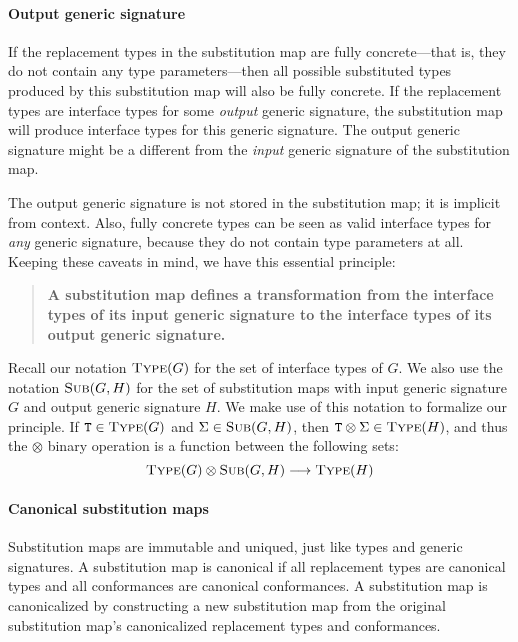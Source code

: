 \documentclass[../generics]{subfiles}
\begin{document}
\paragraph{Output generic signature}
%
If the replacement types in the substitution map are fully concrete---that is, they do not contain any type parameters---then all possible substituted types produced by this substitution map will also be fully concrete. If the replacement types are interface types for some \emph{output} generic signature, the substitution map will produce interface types for this generic signature. The output generic signature might be a different from the \emph{input} generic signature of the substitution map. 

The output generic signature is not stored in the substitution map; it is implicit from context. Also, fully concrete types can be seen as valid interface types for \emph{any} generic signature, because they do not contain type parameters at all. Keeping these caveats in mind, we have this essential principle:
\begin{quote}
\textbf{A substitution map defines a transformation from the interface types of its input generic signature to the interface types of its output generic signature.}
\end{quote}
Recall our notation $\textsc{Type}({G})$ for the set of interface types of $G$. We also use the notation $\textsc{Sub}({G, H})$ for the set of substitution maps with input generic signature $G$ and output generic signature $H$. We make use of this notation to formalize our principle. If $\texttt{T}\in\textsc{Type}({G})$ and $\Sigma\in\textsc{Sub}({G, H})$, then $\texttt{T}\otimes\Sigma\in\textsc{Type}({H})$, and thus the $\otimes$ binary operation is a function between the following sets:
\[\textsc{Type}({G})\otimes\textsc{Sub}({G, H})\longrightarrow\textsc{Type}({H})\]

\paragraph{Canonical substitution maps}
%
%
%
%
Substitution maps are immutable and uniqued, just like types and generic signatures. A substitution map is canonical if all replacement types are canonical types and all conformances are canonical conformances. A substitution map is canonicalized by constructing a new substitution map from the original substitution map's canonicalized replacement types and conformances.
\end{document}
